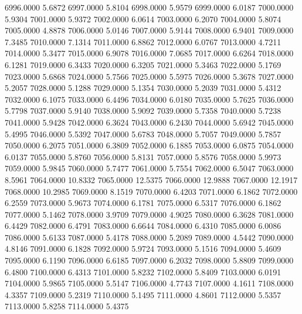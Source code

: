 6996.0000      5.6872
6997.0000      5.8104
6998.0000      5.9579
6999.0000      6.0187
7000.0000      5.9304
7001.0000      5.9372
7002.0000      6.0614
7003.0000      6.2070
7004.0000      5.8074
7005.0000      4.8878
7006.0000      5.0146
7007.0000      5.9144
7008.0000      6.9401
7009.0000      7.3485
7010.0000      7.1314
7011.0000      6.8862
7012.0000      6.0767
7013.0000      4.7211
7014.0000      5.3477
7015.0000      6.9078
7016.0000      7.0685
7017.0000      6.6264
7018.0000      6.1281
7019.0000      6.3433
7020.0000      6.3205
7021.0000      5.3463
7022.0000      5.1769
7023.0000      5.6868
7024.0000      5.7566
7025.0000      5.5975
7026.0000      5.3678
7027.0000      5.2057
7028.0000      5.1288
7029.0000      5.1354
7030.0000      5.2039
7031.0000      5.4312
7032.0000      6.1075
7033.0000      6.4496
7034.0000      6.0180
7035.0000      5.7625
7036.0000      5.7798
7037.0000      5.9140
7038.0000      5.9092
7039.0000      5.7358
7040.0000      5.7238
7041.0000      5.9428
7042.0000      6.3624
7043.0000      6.2430
7044.0000      5.6942
7045.0000      5.4995
7046.0000      5.5392
7047.0000      5.6783
7048.0000      5.7057
7049.0000      5.7857
7050.0000      6.2075
7051.0000      6.3809
7052.0000      6.1885
7053.0000      6.0875
7054.0000      6.0137
7055.0000      5.8760
7056.0000      5.8131
7057.0000      5.8576
7058.0000      5.9973
7059.0000      5.9845
7060.0000      5.7477
7061.0000      5.7554
7062.0000      6.5047
7063.0000      8.5961
7064.0000     10.8332
7065.0000     12.5375
7066.0000     12.9888
7067.0000     12.1917
7068.0000     10.2985
7069.0000      8.1519
7070.0000      6.4203
7071.0000      6.1862
7072.0000      6.2559
7073.0000      5.9673
7074.0000      6.1781
7075.0000      6.5317
7076.0000      6.1862
7077.0000      5.1462
7078.0000      3.9709
7079.0000      4.9025
7080.0000      6.3628
7081.0000      6.4429
7082.0000      6.4791
7083.0000      6.6644
7084.0000      6.4310
7085.0000      6.0086
7086.0000      5.6133
7087.0000      5.4178
7088.0000      5.2089
7089.0000      4.5442
7090.0000      4.8146
7091.0000      6.1828
7092.0000      5.9724
7093.0000      5.1516
7094.0000      5.4609
7095.0000      6.1190
7096.0000      6.6185
7097.0000      6.2032
7098.0000      5.8809
7099.0000      6.4800
7100.0000      6.4313
7101.0000      5.8232
7102.0000      5.8409
7103.0000      6.0191
7104.0000      5.9865
7105.0000      5.5147
7106.0000      4.7743
7107.0000      4.1611
7108.0000      4.3357
7109.0000      5.2319
7110.0000      5.1495
7111.0000      4.8601
7112.0000      5.5357
7113.0000      5.8258
7114.0000      5.4375
